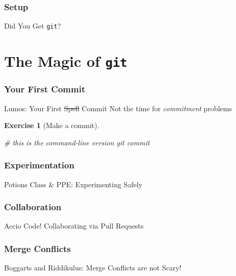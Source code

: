 \documentclass{beamer}
\theoremstyle{example}
\newtheorem{exercise}{Exercise}
\begin{document}
\section{Setup}
\begin{frame}{Did You Get \texttt{git}?}
\end{frame}

\part{The Magic of \texttt{git}}
\frame{\partpage}
\frame{\tableofcontents[part=2]}

\section{Your First Commit}
\begin{frame}[fragile]{Lumos: Your First \sout{Spell} Commit}
    Not the time for \emph{commitment} problems
    \begin{exercise}[Make a commit]
        \begin{shell}
# this is the command-line version
git commit
        \end{shell}
    \end{exercise}
\end{frame}

\section{Experimentation}
\begin{frame}{Potions Class \& PPE\@: Experimenting Safely}
\end{frame}

\section{Collaboration}
\begin{frame}{Accio Code! Collaborating via Pull Requests}
\end{frame}

\section{{\textdagger}Merge Conflicts{\textdagger}}
\begin{frame}{Boggarts and Riddikulus: Merge Conflicts are \alert{not} Scary!}
\end{frame}
\end{document}
